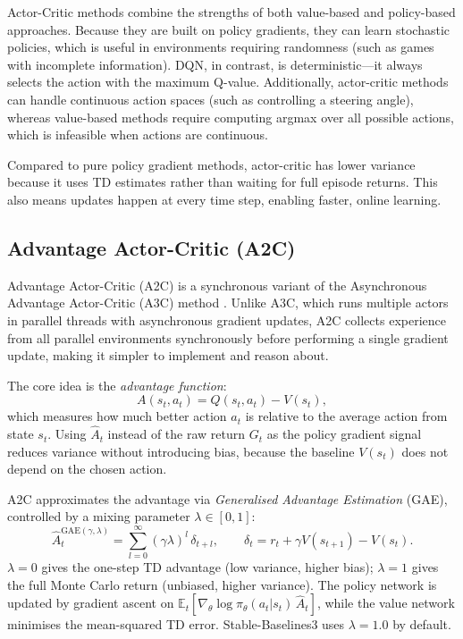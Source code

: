 Actor-Critic methods combine the strengths of both value-based and policy-based approaches. Because they are built on policy gradients, they can learn stochastic policies, which is useful in environments requiring randomness (such as games with incomplete information). DQN, in contrast, is deterministic—it always selects the action with the maximum Q-value. Additionally, actor-critic methods can handle continuous action spaces (such as controlling a steering angle), whereas value-based methods require computing argmax over all possible actions, which is infeasible when actions are continuous.

Compared to pure policy gradient methods, actor-critic has lower variance because it uses TD estimates rather than waiting for full episode returns. This also means updates happen at every time step, enabling faster, online learning.

\subsection{Advantage Actor-Critic (A2C)}
\label{subsec:a2c}

Advantage Actor-Critic (A2C) is a synchronous variant of the Asynchronous Advantage Actor-Critic (A3C) method \citep{mnih2016a3c}. Unlike A3C, which runs multiple actors in parallel threads with asynchronous gradient updates, A2C collects experience from all parallel environments synchronously before performing a single gradient update, making it simpler to implement and reason about.

{\color{red} The core idea is the \emph{advantage function}:
\[
  A(s_t, a_t) = Q(s_t, a_t) - V(s_t),
\]
which measures how much better action $a_t$ is relative to the average action from state $s_t$. Using $\hat{A}_t$ instead of the raw return $G_t$ as the policy gradient signal reduces variance without introducing bias, because the baseline $V(s_t)$ does not depend on the chosen action.}

{\color{red} A2C approximates the advantage via \emph{Generalised Advantage Estimation} (GAE), controlled by a mixing parameter $\lambda \in [0,1]$:
\[
  \hat{A}_t^{\mathrm{GAE}(\gamma,\lambda)} = \sum_{l=0}^{\infty}(\gamma\lambda)^l\,\delta_{t+l},
  \qquad \delta_t = r_t + \gamma V(s_{t+1}) - V(s_t).
\]
$\lambda=0$ gives the one-step TD advantage (low variance, higher bias); $\lambda=1$ gives the full Monte Carlo return (unbiased, higher variance). The policy network is updated by gradient ascent on $\mathbb{E}_t[\nabla_\theta \log\pi_\theta(a_t|s_t)\,\hat{A}_t]$, while the value network minimises the mean-squared TD error. Stable-Baselines3 uses $\lambda=1.0$ by default.}

